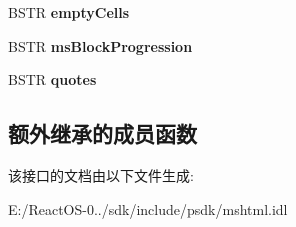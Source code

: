 \begin{DoxyCompactItemize}
B\+S\+TR {\bfseries empty\+Cells}
\item 
\mbox{\label{interface_m_s_h_t_m_l_1_1_i_h_t_m_l_style6_aa3750c1257b98653eb966ace724acdb7}} 
B\+S\+TR {\bfseries ms\+Block\+Progression}
\item 
\mbox{\label{interface_m_s_h_t_m_l_1_1_i_h_t_m_l_style6_a719e221a7d876c72caad6a5f233ab097}} 
B\+S\+TR {\bfseries quotes}
\end{DoxyCompactItemize}
\subsection*{额外继承的成员函数}


该接口的文档由以下文件生成\+:\begin{DoxyCompactItemize}
\item 
E\+:/\+React\+O\+S-\/0../sdk/include/psdk/mshtml.\+idl\end{DoxyCompactItemize}
